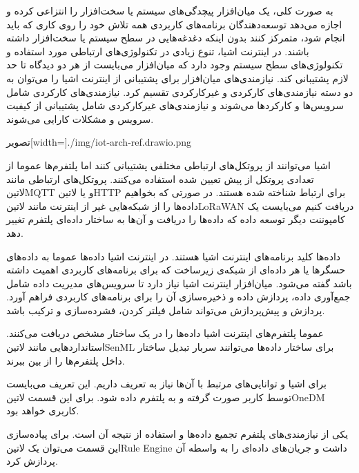 
به صورت کلی، یک میان‌افزار پیچدگی‌های سیستم یا سخت‌افزار را انتزاعی کرده و اجازه می‌دهد
توسعه‌دهندگان برنامه‌های کاربردی همه تلاش خود را روی کاری که باید انجام شود، متمرکز کنند بدون
اینکه دغدغه‌هایی در سطح سیستم یا سخت‌افزار داشته باشند.
در اینترنت اشیا، تنوع زیادی در تکنولوژی‌های ارتباطی مورد استفاده و تکنولوژی‌های سطح سیستم وجود دارد که
میان‌افزار می‌بایست از هر دو دیدگاه تا حد لازم پشتیبانی کند.
نیازمندی‌های میان‌افزار برای پشتیبانی از اینترنت اشیا را می‌توان به دو دسته نیازمندی‌های کارکردی و غیرکارکردی تقسیم کرد.
نیازمندی‌های کارکردی شامل سرویس‌ها و کارکردها می‌شوند و نیازمندی‌های غیرکارکردی شامل پشتیبانی از کیفیت سرویس
و مشکلات کارایی می‌شوند.

‌تصویر[width=\textwidth]{./img/iot-arch-ref.drawio.png}


اشیا می‌توانند از پروتکل‌های ارتباطی مختلفی پشتیبانی کنند اما پلتفرم‌ها عموما از تعدادی پروتکل از پیش تعیین شده استفاده می‌کنند.
پروتکل‌های ارتباطی مانند ‌لاتین{MQTT}
و یا ‌لاتین{HTTP} برای ارتباط شناخته شده هستند.
در صورتی که بخواهیم داده‌ها را از شبکه‌هایی غیر از اینترنت مانند ‌لاتین{LoRaWAN}
دریافت کنیم می‌بایست یک کامپوننت دیگر توسعه داده که داده‌ها را دریافت و آن‌ها به ساختار
داده‌ای پلتفرم تغییر دهد.


داده‌ها کلید برنامه‌های اینترنت اشیا هستند. در اینترنت اشیا داده‌ها عموما به داده‌های حسگرها
یا هر داده‌ای از شبکه‌ی زیرساخت که برای برنامه‌های کاربردی اهمیت داشته باشد گفته می‌شود.
میان‌افزار اینترنت اشیا نیاز دارد تا سرویس‌های مدیریت داده شامل جمع‌آوری داده، پردازش داده و ذخیره‌سازی
آن را برای برنامه‌های کاربردی فراهم آورد.
پردازش و پیش‌پردازش می‌تواند شامل فیلتر کردن، فشرده‌سازی و ترکیب باشد.


عموما پلتفرم‌های اینترنت اشیا داده‌ها را در یک ساختار مشخص
دریافت می‌کنند.
استانداردهایی مانند ‌لاتین{SenML} برای ساختار داده‌ها می‌توانند سربار تبدیل
ساختار داخل پلتفرم‌ها را از بین ببرند.


برای اشیا و توانایی‌های مرتبط با آن‌ها نیاز به تعریف داریم. این تعریف می‌بایست توسط کاربر صورت
گرفته و به پلتفرم داده شود. برای این قسمت ‌لاتین{OneDM} کاربری خواهد بود.


یکی از نیازمندی‌های پلتفرم تجمیع داده‌ها و استفاده از نتیجه آن است.
برای پیاده‌سازی این قسمت می‌توان یک ‌لاتین{Rule Engine} داشت و جریان‌های داده‌ای
را به واسطه آن پردازش کرد.

